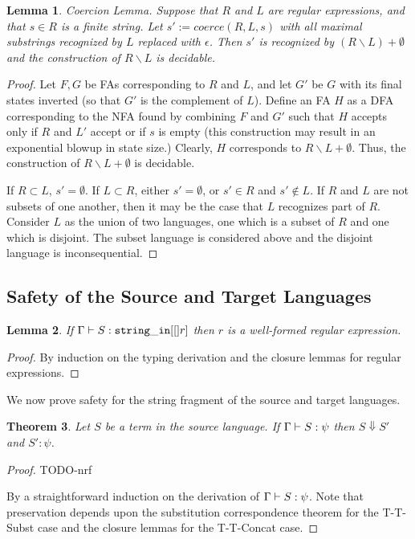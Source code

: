 \documentclass[10pt,preprint]{sigplanconf}
\newtheorem{thm}{Theorem}
\newtheorem{lem}[thm]{Lemma}
\theoremstyle{definition}
\newcommand{\stringin}[1]{{\tt string\_in}[#1]}
\newcommand{\sreduces}{ \Downarrow }
\begin{document}
\begin{lem}{Coercion Lemma.} \label{thm:coercionalemma}
Suppose that $R$ and $L$ are regular expressions, and that $s \in R$ is a finite string.  Let $s' := coerce(R,L,s)$ with all maximal substrings recognized by $L$ replaced with $\epsilon$.  Then $s'$ is recognized by $(R \backslash L) + \emptyset$ and the construction of $R \backslash L$ is decidable.
\end{lem}
\begin{proof}
Let $F,G$ be FAs corresponding to $R$ and $L$, and let $G'$ be $G$ with its final states inverted (so that $G'$ is the complement of $L$).  Define an FA $H$ as a DFA corresponding to the NFA found by combining $F$ and $G'$ such that $H$ accepts only if $R$ and $L'$ accept or if $s$ is empty (this construction may result in an exponential blowup in state size.)  Clearly, $H$ corresponds to $R \backslash L + \emptyset$.  Thus, the construction of $R \backslash L + \emptyset$ is decidable.

If $R \subset L$, $s' = \emptyset$.  If $L \subset R$, either $s' = \emptyset$, or $s' \in R$ and $s' \not \in L$. If $R$ and $L$ are not subsets of one another, then it may be the case that $L$ recognizes part of $R$.  Consider $L$ as the union of two languages, one which is a subset of $R$ and one which is disjoint.  The subset language is considered above and the disjoint language is inconsequential.
\end{proof}


\subsection{Safety of the Source and Target Languages}


\begin{lem}
  If $\sctx \vdash S : \stringin[r]$ then $r$ is a well-formed regular expression. 
\end{lem}
\begin{proof}
  By induction on the typing derivation and the closure lemmas for regular
  expressions.
\end{proof}


We now prove safety for the string fragment of the source and target languages.

\begin{thm}
  Let $S$ be a term in the source language. If $\Gamma \vdash S : \psi$ 
  then $S \sreduces S'$ and $S' : \psi$.
\end{thm}
\begin{proof}
  TODO-nrf

By a straightforward induction on the derivation of $\Gamma \vdash S : \psi$.
Note that preservation depends upon the substitution correspondence theorem
for the T-T-Subst case and the closure lemmas for the T-T-Concat case.
\end{proof}
\end{document}
